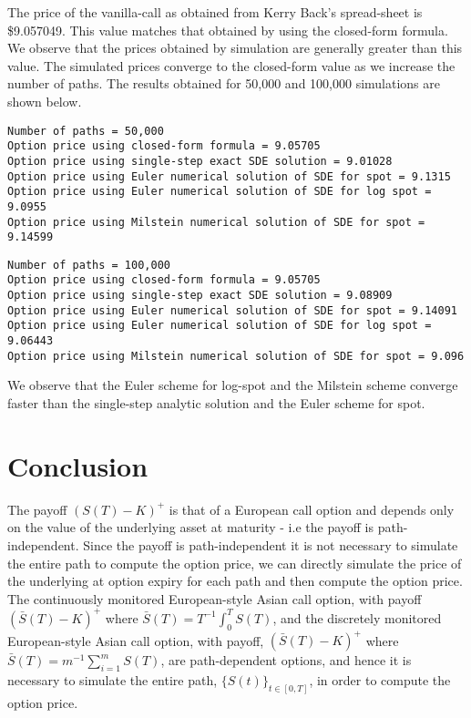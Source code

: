 \documentclass[letterpaper,twoside,11pt,fleqn]{article}
\begin{document}
The price of the vanilla-call as obtained from Kerry Back's spread-sheet is \$9.057049. This value matches that obtained by using the closed-form formula. We observe that the prices obtained by simulation are generally greater than this value.  The simulated prices converge to the closed-form value as we increase the number of paths.  The results obtained for 50,000 and 100,000 simulations are shown below.

\begin{verbatim}
Number of paths = 50,000
Option price using closed-form formula = 9.05705
Option price using single-step exact SDE solution = 9.01028
Option price using Euler numerical solution of SDE for spot = 9.1315
Option price using Euler numerical solution of SDE for log spot = 9.0955
Option price using Milstein numerical solution of SDE for spot = 9.14599
\end{verbatim}

\begin{verbatim}
Number of paths = 100,000
Option price using closed-form formula = 9.05705
Option price using single-step exact SDE solution = 9.08909
Option price using Euler numerical solution of SDE for spot = 9.14091
Option price using Euler numerical solution of SDE for log spot = 9.06443
Option price using Milstein numerical solution of SDE for spot = 9.096
\end{verbatim}

We observe that the Euler scheme for log-spot and the Milstein scheme converge faster than the single-step analytic solution and the Euler scheme for spot.

\section*{Conclusion}
The payoff \( (S(T) - K)^+ \) is that of a European call option and depends only on the value of the underlying asset at maturity - i.e the payoff is path-independent.   Since the payoff is path-independent it is not necessary to simulate the entire path to compute the option price, we can directly simulate the price of the underlying at option expiry for each path and then compute the option price. \\

The continuously monitored European-style Asian call option, with payoff \((\bar{S}(T) - K)^+ \) where \(\bar{S}(T) = T^{-1}\int_0^T S(T) \), and the discretely monitored European-style Asian call option, with payoff,  \((\bar{S}(T) - K)^+ \) where \(\bar{S}(T) = m^{-1}\sum_{i=1}^m S(T) \),  are path-dependent options, and hence it is necessary to simulate the entire path, \( \{S(t) \}_{t \in [0, T]}  \), in order to compute the option price.


\clearpage
\vfill
\pagebreak
\end{document}
